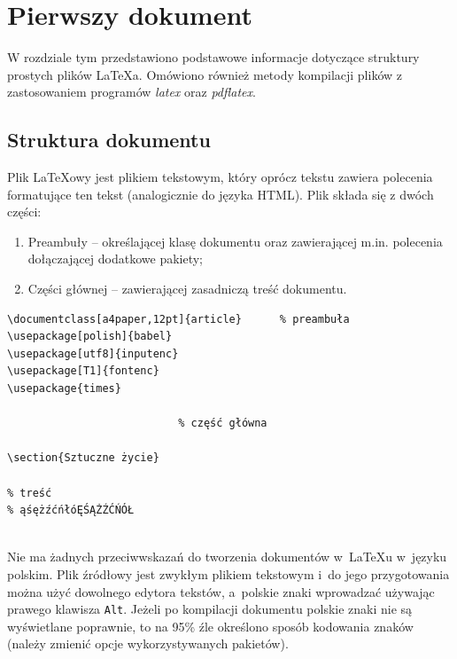 \chapter{Pierwszy dokument}
\label{cha:pierwszyDokument}

W rozdziale tym przedstawiono podstawowe informacje dotyczące struktury prostych plików \LaTeX a. Omówiono również metody kompilacji plików z zastosowaniem programów \emph{latex} oraz \emph{pdflatex}.


\section{Struktura dokumentu}
\label{sec:strukturaDokumentu}

Plik \LaTeX owy jest plikiem tekstowym, który oprócz tekstu zawiera polecenia formatujące ten tekst (analogicznie do języka HTML). Plik składa się z dwóch części:
\begin{enumerate}%
\item Preambuły -- określającej klasę dokumentu oraz zawierającej m.in. polecenia dołączającej dodatkowe pakiety;

\item Części głównej -- zawierającej zasadniczą treść dokumentu.
\end{enumerate}


\begin{lstlisting}
\documentclass[a4paper,12pt]{article}      % preambuła
\usepackage[polish]{babel}
\usepackage[utf8]{inputenc}
\usepackage[T1]{fontenc}
\usepackage{times}

                           % część główna

\section{Sztuczne życie}

% treść
% ąśężźćńłóĘŚĄŻŹĆŃÓŁ


\end{lstlisting}

Nie ma żadnych przeciwwskazań do tworzenia dokumentów w~\LaTeX u w~języku polskim. Plik źródłowy jest zwykłym plikiem tekstowym i~do jego przygotowania można użyć dowolnego edytora tekstów, a~polskie znaki wprowadzać używając prawego klawisza \texttt{Alt}. Jeżeli po kompilacji dokumentu polskie znaki nie są wyświetlane poprawnie, to na 95\% źle określono sposób kodowania znaków (należy zmienić opcje wykorzystywanych pakietów).


